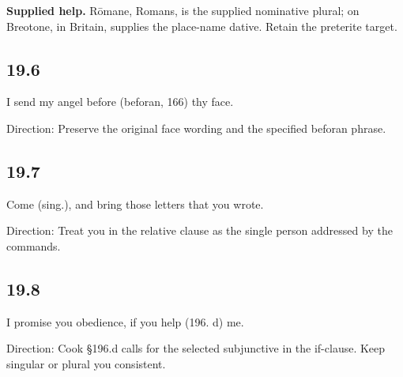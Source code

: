 \textbf{Supplied help.} Rōmane, Romans, is the supplied nominative plural; on Breotone, in Britain, supplies the place-name dative. Retain the preterite target.

\subsection*{19.6}

\par\begin{minipage}{\linewidth}\raggedright
I send my angel before (beforan, 166) thy face.

Direction: Preserve the original face wording and the specified beforan phrase.

\end{minipage}\par\addvspace{4pt}

\subsection*{19.7}

\par\begin{minipage}{\linewidth}\raggedright
Come (sing.), and bring those letters that you wrote.

Direction: Treat you in the relative clause as the single person addressed by the commands.

\end{minipage}\par\addvspace{4pt}

\subsection*{19.8}

\par\begin{minipage}{\linewidth}\raggedright
I promise you obedience, if you help (196. d) me.

Direction: Cook §196.d calls for the selected subjunctive in the if-clause. Keep singular or plural you consistent.

\end{minipage}\par\addvspace{4pt}

